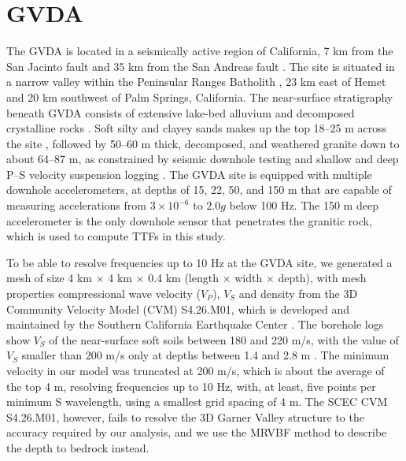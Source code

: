 \section{GVDA}\label{etf:gvda}
The GVDA is located in a seismically active region of California, 7 km from the San Jacinto fault and 35 km from the San Andreas fault \citep[see \cref{fig:etf-1};][]{archuletaGarnerValleyDownhole1992}. The site is situated in a narrow valley within the Peninsular Ranges Batholith \citep{bonillaBoreholeResponseStudies2002}, 23 km east of Hemet and 20 km southwest of Palm Springs, California. The near-surface stratigraphy beneath GVDA consists of extensive lake-bed alluvium and decomposed crystalline rocks \citep{hillGeologyGarnerValley1981}. Soft silty and clayey sands makes up the top 18–25 m across the site \citep{steidlWhatReferenceSite1996}, followed by 50–60 m thick, decomposed, and weathered granite down to about 64–87 m, as constrained by seismic downhole testing and shallow and deep P–S velocity suspension logging \citep{gibbsNearsurfaceSwaveVelocities1989,stellerNewBoreholeGeophysical1996}. The GVDA site is equipped with multiple downhole accelerometers, at depths of 15, 22, 50, and 150 m that are capable of measuring accelerations from $3 \times 10^{-6}$ to $2.0g$ below 100 Hz. The 150 m deep accelerometer is the only downhole sensor that penetrates the granitic rock, which is used to compute TTFs in this study.

To be able to resolve frequencies up to 10 Hz at the GVDA site, we generated a mesh of size 4 km × 4 km × 0.4 km (length × width × depth), with mesh properties compressional wave velocity ($V_P$), $V_S$ and density from the 3D Community Velocity Model (CVM) S4.26.M01, which is developed and maintained by the Southern California Earthquake Center \citep[SCEC;][]{smallSCECUnifiedCommunity2017}. The borehole logs show $V_S$ of the near-surface soft soils between 180 and 220 m/s, with the value of $V_S$ smaller than 200 m/s only at depths between 1.4 and 2.8 m \citep{stellerNewBoreholeGeophysical1996}. The minimum velocity in our model was truncated at 200 m/s, which is about the average of the top 4 m, resolving frequencies up to 10 Hz, with, at least, five points per minimum S wavelength, using a smallest grid spacing of 4 m. The SCEC CVM S4.26.M01, however, fails to resolve the 3D Garner Valley structure to the accuracy required by our analysis, and we use the MRVBF method to describe the depth to bedrock instead.

